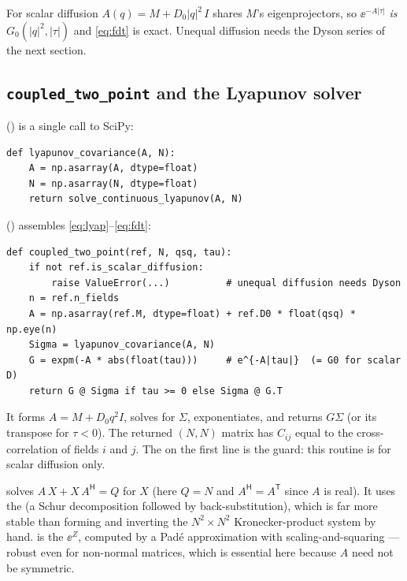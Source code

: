 For scalar diffusion $A(q)=M+D_{0}|q|^{2}\,I$ shares $M$'s eigenprojectors, so
$\ee^{-A|\tau|}$ \emph{is} $G_{0}(|q|^{2},|\tau|)$ and \eqref{eq:fdt} is exact.
Unequal diffusion needs the Dyson series of the next section.

\subsection{\texttt{coupled\_two\_point} and the Lyapunov solver}

 () is a
single call to SciPy:

\begin{lstlisting}
def lyapunov_covariance(A, N):
    A = np.asarray(A, dtype=float)
    N = np.asarray(N, dtype=float)
    return solve_continuous_lyapunov(A, N)
\end{lstlisting}

() assembles \eqref{eq:lyap}--\eqref{eq:fdt}:

\begin{lstlisting}
def coupled_two_point(ref, N, qsq, tau):
    if not ref.is_scalar_diffusion:
        raise ValueError(...)          # unequal diffusion needs Dyson
    n = ref.n_fields
    A = np.asarray(ref.M, dtype=float) + ref.D0 * float(qsq) * np.eye(n)
    Sigma = lyapunov_covariance(A, N)
    G = expm(-A * abs(float(tau)))     # e^{-A|tau|}  (= G0 for scalar D)
    return G @ Sigma if tau >= 0 else Sigma @ G.T
\end{lstlisting}

It forms $A=M+D_{0}q^{2}I$, solves for $\Sigma$, exponentiates, and returns
$G\Sigma$ (or its transpose for $\tau<0$). The returned $(N,N)$ matrix has
$C_{ij}$ equal to the cross-correlation of fields $i$ and $j$. The
 on the first line is the guard: this routine is for scalar
diffusion only.

\begin{defn}
 solves
$A\,X+X\,A^{\mathsf H}=Q$ for $X$ (here $Q=N$ and $A^{\mathsf H}=A^{\mathsf T}$
since $A$ is real). It uses the  (a Schur
decomposition followed by back-substitution), which is far more stable than
forming and inverting the $N^{2}\times N^{2}$ Kronecker-product system by hand.
 is the  $\ee^{Z}$, computed
by a Pad\'e approximation with scaling-and-squaring --- robust even for
non-normal matrices, which is essential here because $A$ need not be symmetric.
\end{defn}


